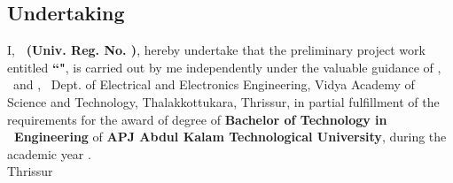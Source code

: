 %
%
%
%
%
%


\begin{titlepage}



\chapter*{\centering Undertaking}
%


\quad \quad I, {\bf \vauthor\ (Univ. Reg. No. \vregisternumber)}, hereby undertake that the preliminary project work entitled {\bf ``\vtitle"}, is carried out by me independently under the valuable guidance of {\bf \vguide}, \vguidedg\ and {\bf \vcoguide}, \vcoguidedg\ Dept. of Electrical and Electronics Engineering, Vidya Academy of Science and Technology, Thalakkottukara, Thrissur, in partial fulfillment of the requirements for the award of degree of {\bf Bachelor of Technology in \vdept\ Engineering} of {\bf APJ Abdul Kalam Technological University}, during the academic year \vacademicyear.\\[2 cm]

\noindent Thrissur \hfill  {\bf \vauthor} \\
\vdate 


\end{titlepage}



